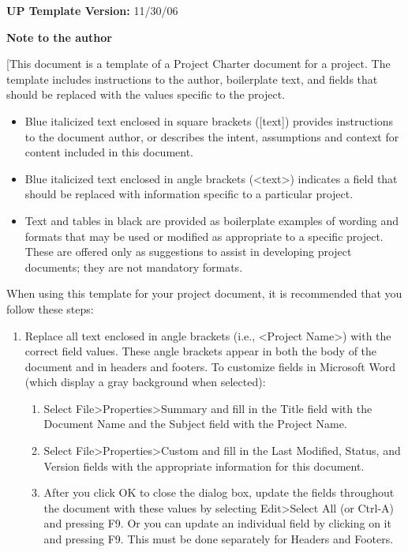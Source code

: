 \documentclass[a4paper, 11pt]{article}
\begin{document}
\hfill \textbf{UP Template Version:} 11/30/06

\newpage


\textbf{Note to the author}

{[}This document is a template of a Project Charter document for a
project. The template includes instructions to the author, boilerplate
text, and fields that should be replaced with the values specific to the
project.

\begin{itemize}
\item
  Blue italicized text enclosed in square brackets ({[}text{]}) provides
  instructions to the document author, or describes the intent,
  assumptions and context for content included in this document.
\item
  Blue italicized text enclosed in angle brackets
  (\textless{}text\textgreater{}) indicates a field that should be
  replaced with information specific to a particular project.
\item
  Text and tables in black are provided as boilerplate examples of
  wording and formats that may be used or modified as appropriate to a
  specific project. These are offered only as suggestions to assist in
  developing project documents; they are not mandatory formats.
\end{itemize}

When using this template for your project document, it is recommended
that you follow these steps:

\begin{enumerate}
\def\labelenumi{\arabic{enumi}.}
\item
  Replace all text enclosed in angle brackets (i.e., \textless{}Project
  Name\textgreater{}) with the correct field values. These angle
  brackets appear in both the body of the document and in headers and
  footers. To customize fields in Microsoft Word (which display a gray
  background when selected):

  \begin{enumerate}
  \def\labelenumii{\alph{enumii}.}
  \item
    Select File\textgreater{}Properties\textgreater{}Summary and fill in
    the Title field with the Document Name and the Subject field with
    the Project Name.
  \item
    Select File\textgreater{}Properties\textgreater{}Custom and fill in
    the Last Modified, Status, and Version fields with the appropriate
    information for this document.
  \item
    After you click OK to close the dialog box, update the fields
    throughout the document with these values by selecting
    Edit\textgreater{}Select All (or Ctrl-A) and pressing F9. Or you can
    update an individual field by clicking on it and pressing F9. This
    must be done separately for Headers and Footers.
  \end{enumerate}
\end{enumerate}
\end{document}
